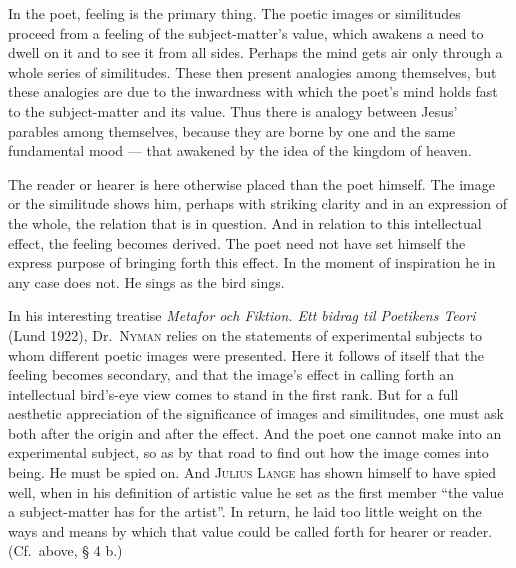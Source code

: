 \documentclass[12pt]{book}
\newcommand{\opage}[1]{\marginnote{\footnotesize\textit{[#1]}}}
\begin{document}
In the poet, feeling is the primary thing. The poetic \opage{131}images or similitudes
proceed from a feeling of the subject-matter's value, which awakens a need to
dwell on it and to see it from all sides. Perhaps the mind gets air only through a
whole series of similitudes. These then present analogies among themselves, but
these analogies are due to the inwardness with which the poet's mind holds fast to
the subject-matter and its value. Thus there is analogy between Jesus' parables
among themselves, because they are borne by one and the same fundamental mood ---
that awakened by the idea of the kingdom of heaven.

The reader or hearer is here otherwise placed than the poet himself. The image or
the similitude shows him, perhaps with striking clarity and in an expression of
the whole, the relation that is in question. And in relation to this intellectual
effect, the feeling becomes derived. The poet need not have set himself the express
purpose of bringing forth this effect. In the moment of inspiration he in any case
does not. He sings as the bird sings.

In his interesting treatise \textit{Metafor och Fiktion. Ett bidrag til Poetikens
Teori} (Lund 1922), Dr.\ \textsc{Nyman} relies on the statements of experimental
subjects to whom different poetic images were presented. Here it follows of itself
that the feeling becomes secondary, and that the image's effect in calling forth an
intellectual bird's-eye view comes to stand in the first rank. But for a full
aesthetic appreciation of the significance of images and similitudes, one must ask
both after the origin and after the effect. And the poet one cannot make into an
experimental subject, so as by that road to find out how the image comes into
being. He must be spied on. And \textsc{Julius Lange} has shown himself to have
spied well, when in his definition of artistic value he set as the first member
``the value a subject-matter has for the artist''. In return, he laid too little
weight on the ways and means \opage{132}by which that value could be called forth for hearer
or reader. (Cf.\ above, § 4 b.)
\end{document}
